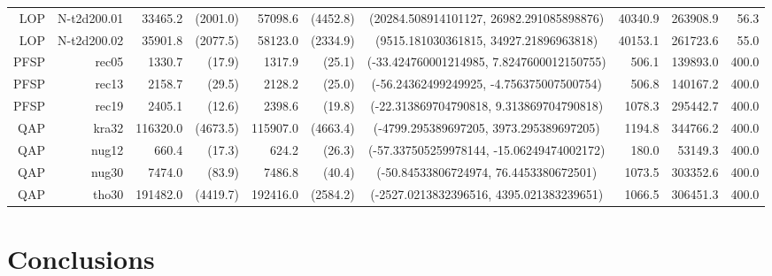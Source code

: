\documentclass[runningheads]{llncs}
\begin{document}
\begin{table}
{\begin{tabular}{*{6}{r}c*{3}{r}}
    LOP     & N-t2d200.01      & 33465.2                      & (2001.0)        & 57098.6                             & (4452.8) & (20284.508914101127, 26982.291085898876)  & 40340.9 & 263908.9 & 56.3  \\
    LOP     & N-t2d200.02      & 35901.8                      & (2077.5)        & 58123.0                             & (2334.9) & (9515.181030361815, 34927.21896963818)    & 40153.1 & 261723.6 & 55.0  \\\midrule
   PFSP     & rec05            & 1330.7                       & (17.9)          & 1317.9                              & (25.1)   & (-33.424760001214985, 7.8247600012150755) & 506.1   & 139893.0 & 400.0 \\
   PFSP     & rec13            & 2158.7                       & (29.5)          & 2128.2                              & (25.0)   & (-56.24362499249925, -4.756375007500754)  & 506.8   & 140167.2 & 400.0 \\
   PFSP     & rec19            & 2405.1                       & (12.6)          & 2398.6                              & (19.8)   & (-22.313869704790818, 9.313869704790818)  & 1078.3  & 295442.7 & 400.0 \\\midrule
    QAP     & kra32            & 116320.0                     & (4673.5)        & 115907.0                            & (4663.4) & (-4799.295389697205, 3973.295389697205)   & 1194.8  & 344766.2 & 400.0 \\
    QAP     & nug12            & 660.4                        & (17.3)          & 624.2                               & (26.3)   & (-57.337505259978144, -15.06249474002172) & 180.0   & 53149.3  & 400.0 \\
    QAP     & nug30            & 7474.0                       & (83.9)          & 7486.8                              & (40.4)   & (-50.84533806724974, 76.4453380672501)    & 1073.5  & 303352.6 & 400.0 \\
    QAP     & tho30            & 191482.0                     & (4419.7)        & 192416.0                            & (2584.2) & (-2527.0213832396516, 4395.021383239651)  & 1066.5  & 306451.3 & 400.0 \\
\bottomrule
\end{tabular}}
\end{table}


\section{Conclusions}
\end{document}
